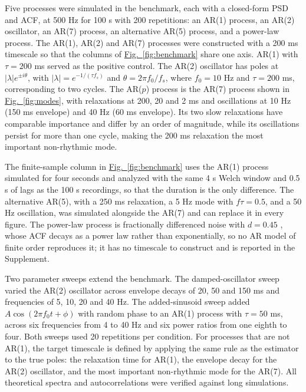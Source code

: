 \documentclass[pdflatex,lineno,sn-nature]{sn-jnl}
\newcommand{\figpanel}[3][]{\hyperref[#2]{Fig.~#1\ref*{#2}#3}}
\theoremstyle{thmstyleone}
\theoremstyle{thmstyletwo}
\theoremstyle{thmstylethree}
\begin{document}
Five processes were simulated in the benchmark, each with a closed-form PSD and ACF, at 500 Hz for 100 s with 200 repetitions: an AR(1) process, an AR(2) oscillator, an AR(7) process, an alternative AR(5) process, and a power-law process. The AR(1), AR(2) and AR(7) processes were constructed with a 200 ms timescale so that the columns of \figpanel{fig:benchmark}{} share one axis. AR(1) with $\tau = 200$ ms served as the positive control. The AR(2) oscillator has poles at $|\lambda| e^{\pm i\theta}$, with $|\lambda| = e^{-1/(\tau f_s)}$ and $\theta = 2\pi f_0/f_s$, where $f_0 = 10$ Hz and $\tau = 200$ ms, corresponding to two cycles. The AR($p$) process is the AR(7) process shown in \figpanel{fig:modes}{}, with relaxations at 200, 20 and 2 ms and oscillations at 10 Hz (150 ms envelope) and 40 Hz (60 ms envelope). Its two slow relaxations have comparable importance and differ by an order of magnitude, while its oscillations persist for more than one cycle, making the 200 ms relaxation the most important non-rhythmic mode.

The finite-sample column in \figpanel{fig:benchmark}{} uses the AR(1) process simulated for four seconds and analyzed with the same 4 s Welch window and 0.5 s of lags as the 100 s recordings, so that the duration is the only difference. The alternative AR(5), with a 250 ms relaxation, a 5 Hz mode with $f\tau = 0.5$, and a 50 Hz oscillation, was simulated alongside the AR(7) and can replace it in every figure. The power-law process is fractionally differenced noise with $d = 0.45$ \cite{granger_introduction_1980, hosking_fractional_1981}, whose ACF decays as a power law rather than exponentially, so no AR model of finite order reproduces it; it has no timescale to construct and is reported in the Supplement.

Two parameter sweeps extend the benchmark. The damped-oscillator sweep varied the AR(2) oscillator across envelope decays of 20, 50 and 150 ms and frequencies of 5, 10, 20 and 40 Hz. The added-sinusoid sweep added $A\cos(2\pi f_0 t + \phi)$ with random phase to an AR(1) process with $\tau = 50$ ms, across six frequencies from 4 to 40 Hz and six power ratios from one eighth to four. Both sweeps used 20 repetitions per condition. For processes that are not AR(1), the target timescale is defined by applying the same rule as the estimator to the true poles: the relaxation time for AR(1), the envelope decay for the AR(2) oscillator, and the most important non-rhythmic mode for the AR(7). All theoretical spectra and autocorrelations were verified against long simulations.
\end{document}
